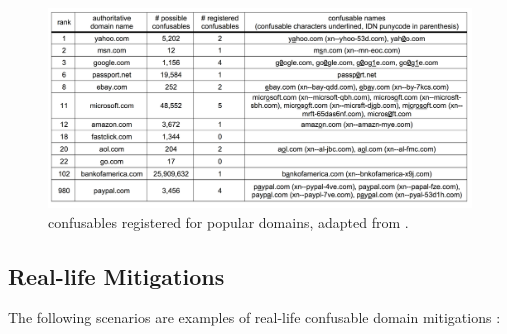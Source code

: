 \captionsetup{font= footnotesize}
\begin{figure}[H]
    \centering
    \includegraphics[width=1\linewidth]{evaluation/confusable.png}
    
    \caption{confusables registered for popular domains, adapted from \cite{HomographAttacks}.}
    \label{fig:figureAlot1}
\end{figure}

\subsection{ Real-life Mitigations}

The following scenarios are examples of real-life confusable domain mitigations :

